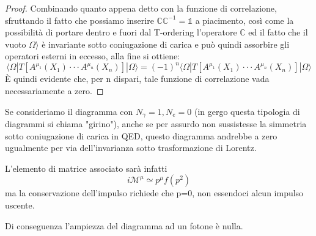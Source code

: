 \documentclass[../main.tex]{subfiles}
\begin{document}
\begin{enumerate}
\begin{proof}
                Combinando quanto appena detto con la funzione di correlazione, sfruttando il fatto che possiamo inserire $\mathbb{C}\mathbb{C}^{-1}=\mathbb{1}$ a piacimento, così come la possibilità di portare dentro e fuori dal T-ordering l'operatore $\mathbb{C}$ ed il fatto che il vuoto $\Omega\rangle$ è invariante sotto coniugazione di carica e può quindi assorbire gli operatori esterni in eccesso, alla fine si ottiene:
                \[\langle\Omega|T[A^{\mu_1}(X_1)\cdot\cdot\cdot A^{\mu_n}(X_n)]|\Omega\rangle = (-1)^n\langle\Omega|T[A^{\mu_1}(X_1)\cdot\cdot\cdot A^{\mu_n}(X_n)]|\Omega\rangle
                \]
                È quindi evidente che, per n dispari, tale funzione di correlazione vada necessariamente a zero.
                \end{proof}
                \begin{nota}
                Se consideriamo il diagramma con $N_\gamma=1, N_e=0$ (in gergo questa tipologia di diagrammi si chiama "girino"), anche se per assurdo non sussistesse la simmetria sotto coniugazione di carica in QED, questo diagramma andrebbe a zero ugualmente per via dell'invarianza sotto trasformazione di Lorentz.

                L'elemento di matrice associato sarà infatti \[i\mathscr{M}^\mu \simeq p^\mu f(p^2)\]ma la conservazione dell'impulso richiede che p=0, non essendoci alcun impulso uscente.

                Di conseguenza l'ampiezza del diagramma ad un fotone è nulla.\\
                

\end{nota}
\end{enumerate}
\end{document}
